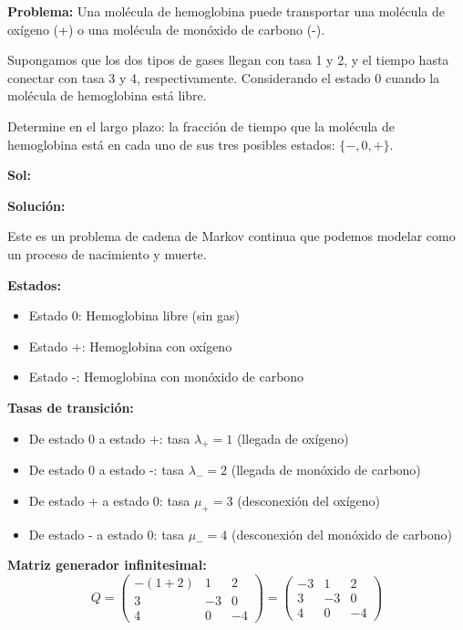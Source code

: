 \documentclass[12pt,a4paper]{article}
\begin{document}
\textbf{Problema:} Una molécula de hemoglobina puede transportar una molécula de oxígeno (+) o una molécula de monóxido de carbono (-).

Supongamos que los dos tipos de gases llegan con tasa 1 y 2, y el tiempo hasta conectar con tasa 3 y 4, respectivamente. Considerando el estado 0 cuando la molécula de hemoglobina está libre.

Determine en el largo plazo: la fracción de tiempo que la molécula de hemoglobina está en cada uno de sus tres posibles estados: $\{-, 0, +\}$.

\textbf{Sol:}

\textbf{Solución:}

Este es un problema de cadena de Markov continua que podemos modelar como un proceso de nacimiento y muerte.

\textbf{Estados:}
\begin{itemize}
\item Estado 0: Hemoglobina libre (sin gas)
\item Estado +: Hemoglobina con oxígeno
\item Estado -: Hemoglobina con monóxido de carbono
\end{itemize}

\textbf{Tasas de transición:}
\begin{itemize}
\item De estado 0 a estado +: tasa $\lambda_+ = 1$ (llegada de oxígeno)
\item De estado 0 a estado -: tasa $\lambda_- = 2$ (llegada de monóxido de carbono)
\item De estado + a estado 0: tasa $\mu_+ = 3$ (desconexión del oxígeno)
\item De estado - a estado 0: tasa $\mu_- = 4$ (desconexión del monóxido de carbono)
\end{itemize}

\textbf{Matriz generador infinitesimal:}
\begin{equation*}
Q = \begin{pmatrix}
-(1+2) & 1 & 2 \\
3 & -3 & 0 \\
4 & 0 & -4
\end{pmatrix} = \begin{pmatrix}
-3 & 1 & 2 \\
3 & -3 & 0 \\
4 & 0 & -4
\end{pmatrix}
\end{equation*}
\end{document}
